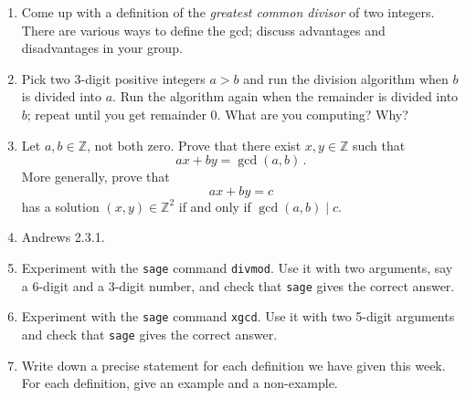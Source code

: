 \documentclass[11pt]{article}
\def\Z{\mathbb{Z}}
\def\sage{{\tt sage} }
\begin{document}
\begin{enumerate}
\begin{proof}
  Assuming that the divison problem this question is concerned with is dealing with integers then the argument of the divison algorithm states that there exists two unique integers q, and r representing the quotient and remainder of the divison. \\
  Some notes:\\
   - The integer divisor cannot be equal to zero as explained in problem 3. \\
   - The remainder must be greater than or equal to zero. \\
   - It does not make sense to have the remainder be greater than or equal to the divisor of the division operation occuring since it would be divided into a smaller remainder so it must be less than\\
   - The resulting quotient and remainder can be used to re-express the dividend.
   \\\\
   Expressed symbolically:
   Given two integers n and m $\in \mathbb{Z}, m \neq 0$
   \[
     \exists ! \quad q,r \in \mathbb{Z} : n= qm+r, 0 \leq r <b
   \]
   To prove this statement we will have to prove both existence and uniqueness.
   \textbf{Existence}:
   Given that n and m are integers the operation of $\frac{n}{m}$
   \\\\
\end{proof}

\item Come up with a definition of the \emph{greatest common divisor} of two integers.
There are various ways to define the gcd; discuss advantages and disadvantages in your group.

\item Pick two 3-digit positive integers $a > b$ and run the division algorithm when $b$ is divided into $a$.
Run the algorithm again when the remainder is divided into $b$; repeat until you get remainder 0.
What are you computing? Why?

\item Let $a, b \in \Z$, not both zero.
Prove that there exist $x, y \in \Z$ such that
\[
  ax+by = \gcd(a,b) \, .
\]
More generally, prove that
\[
  ax+by = c
\]
has a solution $(x,y) \in \Z^2$ if and only if $\gcd(a,b) \mid c$.

\item Andrews 2.3.1.

\item Experiment with the \sage command {\tt divmod}.
Use it with two arguments, say a 6-digit and a 3-digit number, and check that \sage gives the correct answer.

\item Experiment with the \sage command {\tt xgcd}.
Use it with two 5-digit arguments and check that \sage gives the correct answer.

\item Write down a precise statement for each definition we have given this week.
For each definition, give an example and a non-example.

\end{enumerate}
\end{document}
